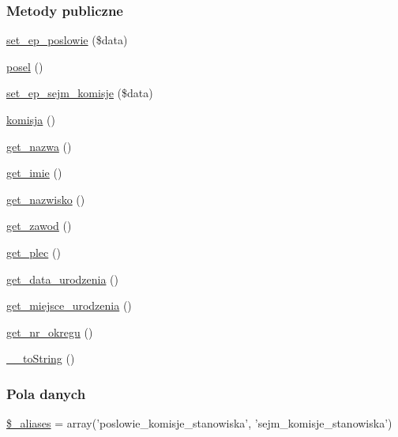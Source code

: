 \subsubsection*{Metody publiczne}
\begin{DoxyCompactItemize}
\item 
\hyperlink{classep___posel___komisja___stanowisko_a6a354494d54778bcc9254b5826b5f28c}{set\-\_\-ep\-\_\-poslowie} (\$data)
\item 
\hyperlink{classep___posel___komisja___stanowisko_ad3b9fc55831f7bcabb4870306bc08f4b}{posel} ()
\item 
\hyperlink{classep___posel___komisja___stanowisko_a1a21d8ba0207f2d4a8c26575c8b30970}{set\-\_\-ep\-\_\-sejm\-\_\-komisje} (\$data)
\item 
\hyperlink{classep___posel___komisja___stanowisko_a1d71a6ebf9406f2a818e18f4df5a5728}{komisja} ()
\item 
\hyperlink{classep___posel___komisja___stanowisko_ac0818f0049d7b84f08f77128f54cee36}{get\-\_\-nazwa} ()
\item 
\hyperlink{classep___posel___komisja___stanowisko_ac4b0c85dc2a130038f2d118dbd0c3d77}{get\-\_\-imie} ()
\item 
\hyperlink{classep___posel___komisja___stanowisko_abdd1d7ff92508da7f748ba1feec97af0}{get\-\_\-nazwisko} ()
\item 
\hyperlink{classep___posel___komisja___stanowisko_af80ca8310b60004454dd02a387deaa2c}{get\-\_\-zawod} ()
\item 
\hyperlink{classep___posel___komisja___stanowisko_ac7f9af5c3fa024e4c26a7b6bd4ce4bb4}{get\-\_\-plec} ()
\item 
\hyperlink{classep___posel___komisja___stanowisko_a880b240cd2d8c336fd1709bf0cb1ae2c}{get\-\_\-data\-\_\-urodzenia} ()
\item 
\hyperlink{classep___posel___komisja___stanowisko_ac57c08ec5e394a19c5bd9280c8376182}{get\-\_\-miejsce\-\_\-urodzenia} ()
\item 
\hyperlink{classep___posel___komisja___stanowisko_a2645a9f0aa5b0ccc482943348c033d0a}{get\-\_\-nr\-\_\-okregu} ()
\item 
\hyperlink{classep___posel___komisja___stanowisko_a7516ca30af0db3cdbf9a7739b48ce91d}{\-\_\-\-\_\-to\-String} ()
\end{DoxyCompactItemize}
\subsubsection*{Pola danych}
\begin{DoxyCompactItemize}
\item 
\hyperlink{classep___posel___komisja___stanowisko_ab4e31d75f0bc5d512456911e5d01366b}{\$\-\_\-aliases} = array('poslowie\-\_\-komisje\-\_\-stanowiska', 'sejm\-\_\-komisje\-\_\-stanowiska')
\end{DoxyCompactItemize}
